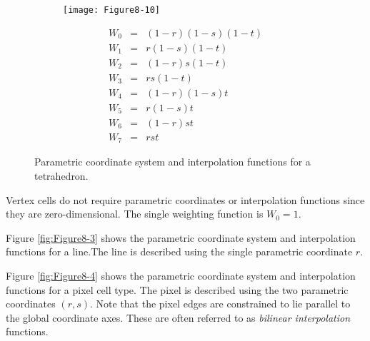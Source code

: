 \begin{description}[leftmargin=0cm,labelindent=0cm]
    \begin{figure}[!htb]
        \centering
        \begin{subfigure}{0.48\linewidth}
            \centering
            \texttt{[image: Figure8-10]}
            \caption*{}
        \end{subfigure}
        \hfill
        \begin{subfigure}{0.48\linewidth}
            \centering
            \begin{equation*}
            \begin{array}{lll}
            W_0 &=& (1 - r)(1 - s)(1 - t) \\
            W_1 &=& r (1-s)(1 -t) \\
            W_2 &=& (1-r)s(1-t) \\
            W_3 &=& rs(1 - t) \\
            W_4 &=& (1 - r)(1 - s) t \\
            W_5 &=& r (1-s)t \\
            W_6 &=& (1 - r)s t \\
            W_7 &=& r s t
            \end{array}
            \end{equation*}
        \end{subfigure}%
        \caption{Parametric coordinate system and interpolation functions for a tetrahedron.}
        \label{fig:Figure8-10}
    \end{figure}

    \item[Vertex.\index{interpolation function!vertex}] Vertex cells do not require parametric coordinates or interpolation functions since they are zero-dimensional. The single weighting function is $W_0 = 1$.

    \item[Line.\index{interpolation function!line}\index{line!interpolation function}\index{line!parametric coordinate}] Figure \ref{fig:Figure8-3} shows the parametric coordinate system and interpolation functions for a line.The line is described using the single parametric coordinate $r$.

    \item[Pixel.\index{interpolation function!pixel}] Figure \ref{fig:Figure8-4} shows the parametric coordinate system and interpolation functions for a pixel cell type. The pixel is described using the two parametric coordinates $(r,s)$. Note that the pixel edges are constrained to lie parallel to the global coordinate axes. These are often referred to as \emph{bilinear interpolation} functions.


\end{description}
